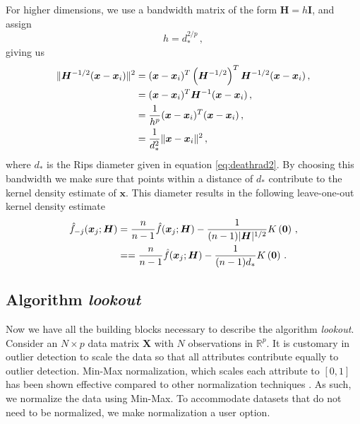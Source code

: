 \documentclass[11pt,a4paper,]{article}
\theoremstyle{definition}
\theoremstyle{definition}
\theoremstyle{definition}
\theoremstyle{remark}
\begin{document}
For higher dimensions, we use a bandwidth matrix of the form \(\bm{H} = h\bm{I}\), and assign
\begin{equation}\label{eq:bandwidth}
    h = d_*^{2/p} \, , 
\end{equation}
giving us
\begin{align}\label{eq:kde11}
    \| \bm{H}^{-1/2}(\bm{x} - \bm{x}_i) \|^2  & = (\bm{x} - \bm{x}_i)^T \left(\bm{H}^{-1/2}\right)^T \bm{H}^{-1/2} (\bm{x} - \bm{x}_i) \, , \notag \\
     & = (\bm{x} - \bm{x}_i)^T \bm{H}^{-1} (\bm{x} - \bm{x}_i) \, , \notag  \\
     & = \frac{1}{h^p}(\bm{x} - \bm{x}_i)^T  (\bm{x} - \bm{x}_i)\, , \notag \\
     & = \frac{1}{d_*^2}\|\bm{x} - \bm{x}_i \|^2 \, , 
\end{align}
where \(d_*\) is the Rips diameter given in equation \eqref{eq:deathrad2}. By choosing this bandwidth we make sure that points within a distance of \(d_*\) contribute to the kernel density estimate of \(\bm{x}\). This diameter results in the following leave-one-out kernel density estimate
\begin{align}\label{eq:kde12}
    \hat{f}_{-j}(\bm{x}_j;\bm{H})  & = \frac{n}{n-1} \hat{f}(\bm{x}_j;\bm{H}) - \frac{1}{(n-1)|\bm{H}|^{1/2}} K\left(\bm{0}\right) \, ,  \notag \\
    & = = \frac{n}{n-1} \hat{f}(\bm{x}_j;\bm{H}) - \frac{1}{(n-1)d_*} K\left(\bm{0}\right) \,  .
\end{align}

\hypertarget{algorithm-lookout}{%
\subsection{\texorpdfstring{Algorithm \emph{lookout}}{Algorithm lookout}}\label{algorithm-lookout}}

Now we have all the building blocks necessary to describe the algorithm \emph{lookout}. Consider an \(N \times p\) data matrix \(\bm{X}\) with \(N\) observations in \(\mathbb{R}^p\). It is customary in outlier detection to scale the data so that all attributes contribute equally to outlier detection. Min-Max normalization, which scales each attribute to \([0, 1]\) has been shown effective compared to other normalization techniques \autocite{kandanaarachchi2018normalization}. As such, we normalize the data using Min-Max. To accommodate datasets that do not need to be normalized, we make normalization a user option.
\end{document}
